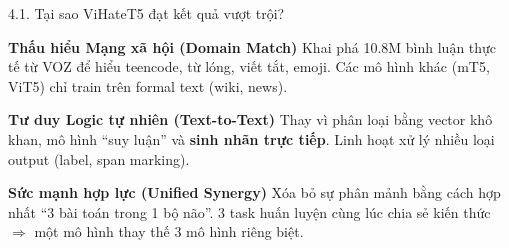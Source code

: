 \documentclass[11pt, aspectratio=169]{beamer}
\begin{document}
\begin{frame}[shrink=5]{4.1. Tại sao ViHateT5 đạt kết quả vượt trội?}
\scriptsize

\begin{block}{\textbf{Thấu hiểu Mạng xã hội (Domain Match)}}
  Khai phá 10.8M bình luận thực tế từ VOZ để hiểu teencode, từ lóng, viết tắt, emoji. Các mô hình khác (mT5, ViT5) chỉ train trên formal text (wiki, news).
\end{block}

\begin{block}{\textbf{Tư duy Logic tự nhiên (Text-to-Text)}}
  Thay vì phân loại bằng vector khô khan, mô hình ``suy luận'' và \textbf{sinh nhãn trực tiếp}. Linh hoạt xử lý nhiều loại output (label, span marking).
\end{block}

\begin{block}{\textbf{Sức mạnh hợp lực (Unified Synergy)}}
  Xóa bỏ sự phân mảnh bằng cách hợp nhất ``3 bài toán trong 1 bộ não''. 3 task huấn luyện cùng lúc chia sẻ kiến thức $\Rightarrow$ một mô hình thay thế 3 mô hình riêng biệt.
\end{block}
\end{frame}
\end{document}
